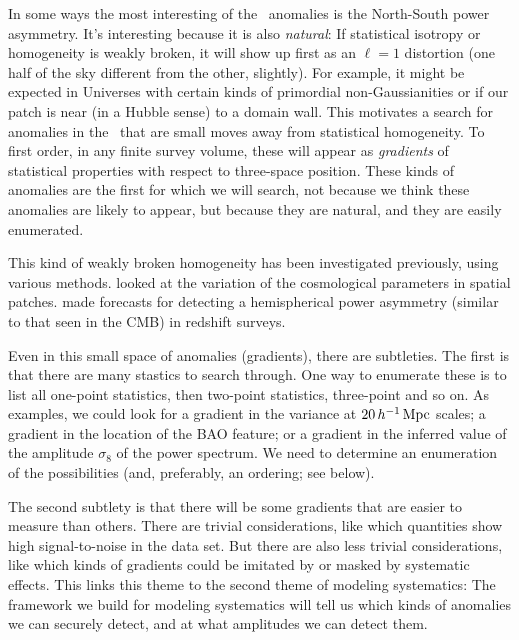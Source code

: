 \documentclass[12pt, fullpage, letterpaper]{article}
\begin{document}
In some ways the most interesting of the \CMB\ anomalies is the
North-South power asymmetry. It's interesting because it is also
\emph{natural}: If statistical isotropy or homogeneity is weakly
broken, it will show up first as an $\ell=1$ distortion (one half of
the sky different from the other, slightly).
For example, it might be expected in Universes with certain kinds
of primordial non-Gaussianities \citep{Dalal2008} or if our patch is
near (in a Hubble sense) to a domain wall.
This motivates a search for anomalies in the \LSS\ that are small
moves away from statistical homogeneity.
To first order, in any finite survey volume, these will appear as
\emph{gradients} of statistical properties with respect to three-space
position.
These kinds of anomalies are the first for which we will search, not
because we think these anomalies are likely to appear, but because they
are natural, and they are easily enumerated.

This kind of weakly broken homogeneity has been investigated previously,
using various methods.
\cite{Mukherjee2018} looked at the variation of the cosmological parameters in spatial patches.
\cite{Zhai2017} made forecasts for detecting a hemispherical power asymmetry (similar to that seen in the CMB) in redshift surveys.

Even in this small space of anomalies (gradients), there are subtleties. The first
is that there are many stastics to search through.
One way to enumerate these is to list all one-point statistics, then two-point statistics, three-point and so on. As examples, we could look for a gradient in the variance at
$20\,h^{-1}\,{\mathrm{Mpc}}$ scales; a gradient in the location
of the BAO feature; or a gradient in the inferred value of the amplitude
$\sigma_8$ of the power spectrum.
We need to determine an enumeration of the possibilities (and, preferably, an
ordering; see below).

The second subtlety is that there will be some gradients that are easier
to measure than others. There are trivial considerations, like which
quantities show high signal-to-noise in the data set. But there are also less
trivial considerations, like which kinds of gradients could be imitated by or
masked by systematic effects.
This links this theme to the second theme of modeling systematics:
The framework we build for modeling systematics will tell us which
kinds of anomalies we can securely detect, and at what amplitudes we
can detect them.
\end{document}
